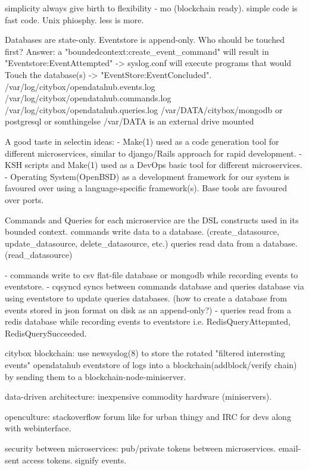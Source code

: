 simplicity always give birth to flexibility - mo (blockchain ready). simple code is fast code. Unix phiosphy. less is more.

Databases are state-only. 
Eventstore is append-only. 
Who should be touched first?
Answer: a "boundedcontext:create_event_command" will result in 
"Eventstore:EventAttempted" -> syslog.conf will execute programs that would Touch the database(s) -> "EventStore:EventConcluded".
/var/log/citybox/opendatahub.events.log
/var/log/citybox/opendatahub.commands.log
/var/log/citybox/opendatahub.queries.log
/var/DATA/citybox/mongodb or postgresql or somthingelse
/var/DATA is an external drive mounted

A good taste in selectin ideas:
- Make(1) used as a code generation tool for different microservices, similar to django/Rails approach for rapid development. 
- KSH scripts and Make(1) used as a DevOps basic tool for different microservices.
- Operating System(OpenBSD) as a development framework for our system is favoured over using a language-specific framework(s). Base tools are favoured over ports. 

Commands and Queries for each microservice are the DSL constructs used in its bounded context.
commands write data to a database. (create_datasource, update_datasource, delete_datasource, etc.)
queries read data from a database. (read_datasource)

- commands write to csv flat-file database or mongodb while recording events to eventstore.
- cqsyncd syncs between commands database and queries database via using eventstore to update queries databases. (how to create a database from events stored in json format on disk as an append-only?)
- queries read from a redis database while recording events to eventstore i.e. RedisQueryAttepmted, RedisQuerySucceeded.

citybox blockchain: use newsyslog(8) to store the rotated "filtered interesting events" opendatahub eventstore of logs into a blockchain(addblock/verify chain) by sending them to a blockchain-node-miniserver.

data-driven architecture: inexpensive commodity hardware (miniservers).

openculture: stackoverflow forum like for urban thingy and IRC for devs along with webinterface.

security between microservices: 
pub/private tokens between microservices.
email-sent access tokens.
signify events.

